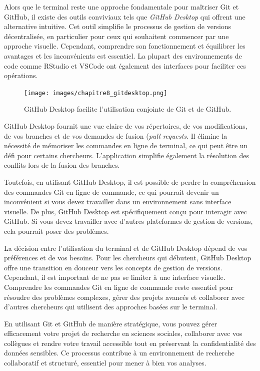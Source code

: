 \documentclass[
  letterpaper,
  DIV=11,
  numbers=noendperiod]{scrreprt}
\begin{document}
Alors que le terminal reste une approche fondamentale pour maîtriser Git
et GitHub, il existe des outils conviviaux tels que \emph{GitHub
Desktop} qui offrent une alternative intuitive. Cet outil simplifie le
processus de gestion de versions décentralisée, en particulier pour ceux
qui souhaitent commencer par une approche visuelle. Cependant,
comprendre son fonctionnement et équilibrer les avantages et les
inconvénients est essentiel. La plupart des environnements de code comme
RStudio et VSCode ont également des interfaces pour faciliter ces
opérations.

\begin{figure}

{\centering \texttt{[image: images/chapitre8\_gitdesktop.png]}

}

\caption{\label{fig-github}GitHub Desktop facilite l'utilisation
conjointe de Git et de GitHub.}

\end{figure}

GitHub Desktop fournit une vue claire de vos répertoires, de vos
modifications, de vos branches et de vos demandes de fusion (\emph{pull
requests}. Il élimine la nécessité de mémoriser les commandes en ligne
de terminal, ce qui peut être un défi pour certains chercheurs.
L'application simplifie également la résolution des conflits lors de la
fusion des branches.

Toutefois, en utilisant GitHub Desktop, il est possible de perdre la
compréhension des commandes Git en ligne de commande, ce qui pourrait
devenir un inconvénient si vous devez travailler dans un environnement
sans interface visuelle. De plus, GitHub Desktop est spécifiquement
conçu pour interagir avec GitHub. Si vous devez travailler avec d'autres
plateformes de gestion de versions, cela pourrait poser des problèmes.

La décision entre l'utilisation du terminal et de GitHub Desktop dépend
de vos préférences et de vos besoins. Pour les chercheurs qui débutent,
GitHub Desktop offre une transition en douceur vers les concepts de
gestion de versions. Cependant, il est important de ne pas se limiter à
une interface visuelle. Comprendre les commandes Git en ligne de
commande reste essentiel pour résoudre des problèmes complexes, gérer
des projets avancés et collaborer avec d'autres chercheurs qui utilisent
des approches basées sur le terminal.

En utilisant Git et GitHub de manière stratégique, vous pouvez gérer
efficacement votre projet de recherche en sciences sociales, collaborer
avec vos collègues et rendre votre travail accessible tout en préservant
la confidentialité des données sensibles. Ce processus contribue à un
environnement de recherche collaboratif et structuré, essentiel pour
mener à bien vos analyses.
\end{document}
